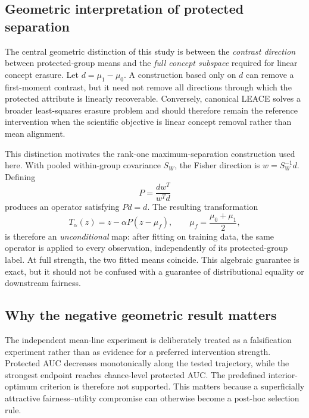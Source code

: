 
\subsection{Geometric interpretation of protected separation}
\label{sec:geometric-interpretation}
The central geometric distinction of this study is between the \emph{contrast direction} between protected-group means and the \emph{full concept subspace} required for linear concept erasure. Let $d=\mu_1-\mu_0$. A construction based only on $d$ can remove a first-moment contrast, but it need not remove all directions through which the protected attribute is linearly recoverable. Conversely, canonical LEACE solves a broader least-squares erasure problem and should therefore remain the reference intervention when the scientific objective is linear concept removal rather than mean alignment.

This distinction motivates the rank-one maximum-separation construction used here. With pooled within-group covariance $S_W$, the Fisher direction is $w=S_W^{-1}d$. Defining
\begin{equation}
P=\frac{dw^T}{w^Td}
\end{equation}
produces an operator satisfying $Pd=d$. The resulting transformation
\begin{equation}
T_\alpha(z)=z-\alpha P(z-\mu_f),\qquad \mu_f=\frac{\mu_0+\mu_1}{2},
\end{equation}
is therefore an \emph{unconditional} map: after fitting on training data, the same operator is applied to every observation, independently of its protected-group label. At full strength, the two fitted means coincide. This algebraic guarantee is exact, but it should not be confused with a guarantee of distributional equality or downstream fairness.

\subsection{Why the negative geometric result matters}
\label{sec:negative-geometric-result}
The independent mean-line experiment is deliberately treated as a falsification experiment rather than as evidence for a preferred intervention strength. Protected AUC decreases monotonically along the tested trajectory, while the strongest endpoint reaches chance-level protected AUC. The predefined interior-optimum criterion is therefore not supported. This matters because a superficially attractive fairness--utility compromise can otherwise become a post-hoc selection rule.

